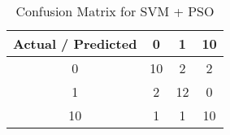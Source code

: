 \begin{table}[ht]
\centering
\caption{Confusion Matrix for SVM + PSO}
\begin{tabular}{c|ccc}
\toprule
Actual / Predicted & 0 & 1 & 10 \\
\midrule
0 & 10 & 2 & 2 \\
1 & 2 & 12 & 0 \\
10 & 1 & 1 & 10 \\
\bottomrule
\end{tabular}
\end{table}
